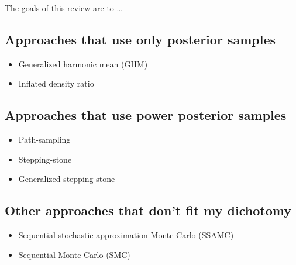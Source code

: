 The goals of this review are to \ldots

\subsection{Approaches that use only posterior samples}

\begin{itemize}
    \item Generalized harmonic mean (GHM) \citep{Gelfand1994}
    \item Inflated density ratio \citep{Arima2012}
\end{itemize}

\subsection{Approaches that use power posterior samples}

\begin{itemize}
    \item Path-sampling \citep{Lartillot2006}
    \item Stepping-stone \citep{Xie2011}
    \item Generalized stepping stone \citep{Fan2011}
\end{itemize}

\subsection{Other approaches that don't fit my dichotomy}

\begin{itemize}
    \item Sequential stochastic approximation Monte Carlo (SSAMC)
        \citep{Liang2007,Cheon2008}
    \item Sequential Monte Carlo (SMC) \citep{Jordan2012}
\end{itemize}
